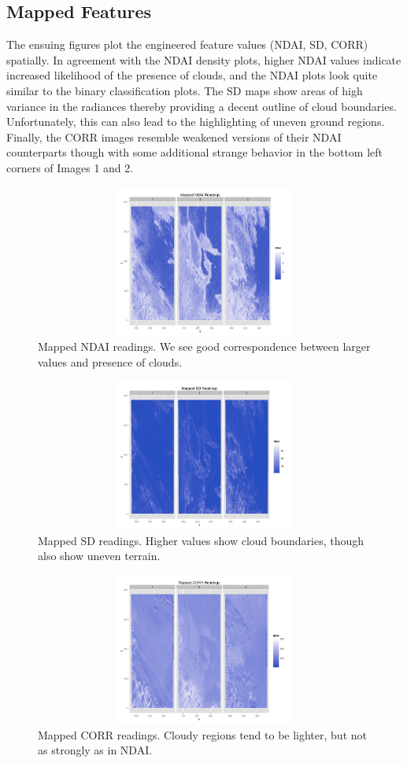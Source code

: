 \documentclass{article}\usepackage[]{graphicx}\usepackage[]{color}
\begin{document}
\subsection{Mapped Features}
The ensuing figures plot the engineered feature values (NDAI, SD, CORR) spatially. In agreement with the NDAI density plots, higher NDAI values indicate increased likelihood of the presence of clouds, and the NDAI plots look quite similar to the binary classification plots. The SD maps show areas of high variance in the radiances thereby providing a decent outline of cloud boundaries. Unfortunately, this can also lead to the highlighting of uneven ground regions. Finally, the CORR images resemble weakened versions of their NDAI counterparts though with some additional strange behavior in the bottom left corners of Images 1 and 2. 
\begin{figure}[H]
\includegraphics[width = 18cm, height = 5cm]{NDAIEDA.png}
\caption{Mapped NDAI readings. We see good correspondence between larger values and presence of clouds.}
\end{figure}

\begin{figure}[H]
\includegraphics[width = 18cm, height = 5cm]{SDEDA.png}
\caption{Mapped SD readings. Higher values show cloud boundaries, though also show uneven terrain.}
\end{figure}

\begin{figure}[H]
\includegraphics[width = 18cm, height = 5cm]{CORREDA.png}
\caption{Mapped CORR readings. Cloudy regions tend to be lighter, but not as strongly as in NDAI.}
\end{figure}
\end{document}
